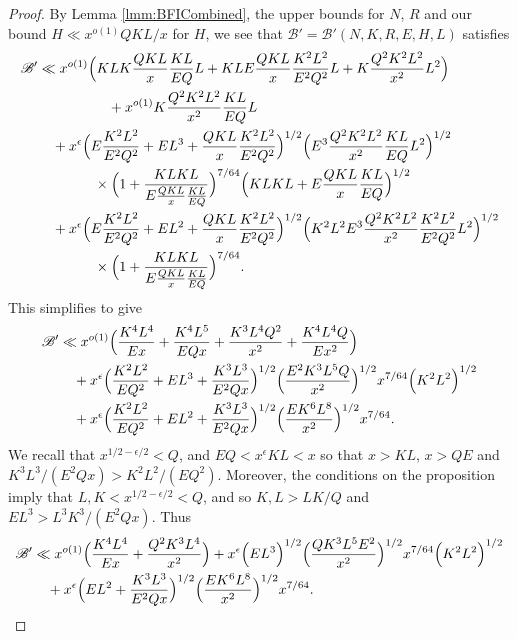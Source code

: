 \documentclass[10pt]{amsart}
\theoremstyle{plain}
\numberwithin{equation}{section}
\begin{document}
\begin{proof}
By Lemma \ref{lmm:BFICombined}, the upper bounds for $N$, $R$ and our bound $H\ll x^{o(1)}QKL/x$ for $H$, we see that $\mathscr{B}'=\mathscr{B}'(N,K,R,E,H,L)$ satisfies
\begin{align*}
\mathscr{B}'&\ll x^{o(1)}\Bigl(KL K\frac{Q K L}{x} \frac{KL}{E Q}L+K L E\frac{Q K L}{x} \frac{K^2 L^2}{E^2 Q^2} L+K \frac{Q^2K^2L^2}{x^2} L^2\Bigr)\\
&\qquad\quad\qquad+x^{o(1)} K\frac{Q^2K^2L^2}{x^2} \frac{KL}{E Q} L\\
&\quad+x^\epsilon \Bigl(E \frac{K^2 L^2}{E^2 Q^2}+E L^3+\frac{Q K L}{x} \frac{K^2 L^2}{E^2 Q^2}\Bigr)^{1/2}\Bigl(E^3 \frac{Q^2K^2L^2}{x^2} \frac{KL}{E Q} L^2\Bigr)^{1/2}\\
&\qquad\qquad\times\Bigl(1+\frac{K L K L}{E \frac{Q K L}{x}\frac{KL}{EQ}}\Bigr)^{7/64} \Bigl( KL K L +E \frac{Q K L}{x} \frac{KL}{E Q}\Bigr)^{1/2} \\
&\quad+x^\epsilon \Bigl(E\frac{K^2 L^2}{E^2 Q^2} +E L^2+\frac{Q K L}{x} \frac{K^2 L^2}{E^2 Q^2}\Bigr)^{1/2}\Bigl(K^2 L^2 E^3 \frac{Q^2 K^2 L^2 }{x^2 } \frac{K^2 L^2}{E^2 Q^2} L^2\Bigr)^{1/2}\\
&\qquad\qquad \times\Bigl(1+\frac{KLK L}{E \frac{Q K L}{x} \frac{K L}{E Q}}\Bigr)^{7/64}.
\end{align*}
This simplifies to give
\begin{align*}
\mathscr{B}'&\ll x^{o(1)}\Bigl(\frac{K^4 L^4}{E x} +\frac{K^4 L^5}{E Q x}+\frac{K^3 L^4 Q^2}{x^2}+\frac{K^4 L^4 Q}{E x^2}\Bigr)\\
&\quad+x^\epsilon \Bigl(\frac{K^2 L^2}{E Q^2}+E L^3+\frac{K^3 L^3}{E^2 Q x}\Bigr)^{1/2}\Bigl( \frac{E^2 K^3 L^5 Q}{x^2} \Bigr)^{1/2}x^{7/64}\Bigl( K^2 L^2 \Bigr)^{1/2} \\
&\quad+x^\epsilon \Bigl(\frac{K^2 L^2}{E Q^2} +E L^2+ \frac{K^3 L^3}{E^2 Q x}\Bigr)^{1/2}\Bigl( \frac{E K^6 L^8}{x^2}\Bigr)^{1/2}x^{7/64}.
\end{align*}
We recall that $x^{1/2-\epsilon/2}<Q$, and $E Q<x^\epsilon K L<x$ so that $x>K L$, $x>Q E$ and $K^3L^3/(E^2 Q x)>K^2L^2/(E Q^2)$. Moreover, the conditions on the proposition imply that $L,K<x^{1/2-\epsilon/2}<Q$, and so $K,L>L K /Q$ and $EL^3> L^3 K^3/(E^2 Q x)$. Thus
\begin{align*}
\mathscr{B}'&\ll x^{o(1)}\Bigl(\frac{K^4 L^4}{E x} +\frac{Q^2 K^3 L^4}{x^2}\Bigr)+x^\epsilon \Bigl(E L^3\Bigr)^{1/2}\Bigl( \frac{Q K^3 L^5 E^2}{x^2} \Bigr)^{1/2}x^{7/64}\Bigl( K^2 L^2 \Bigr)^{1/2} \\
&\quad+x^\epsilon \Bigl(E L^2+ \frac{K^3 L^3}{E^2 Q x}\Bigr)^{1/2}\Bigl( \frac{E K^6 L^8}{ x^2}\Bigr)^{1/2}x^{7/64}.

\end{align*}
\end{proof}
\end{document}
